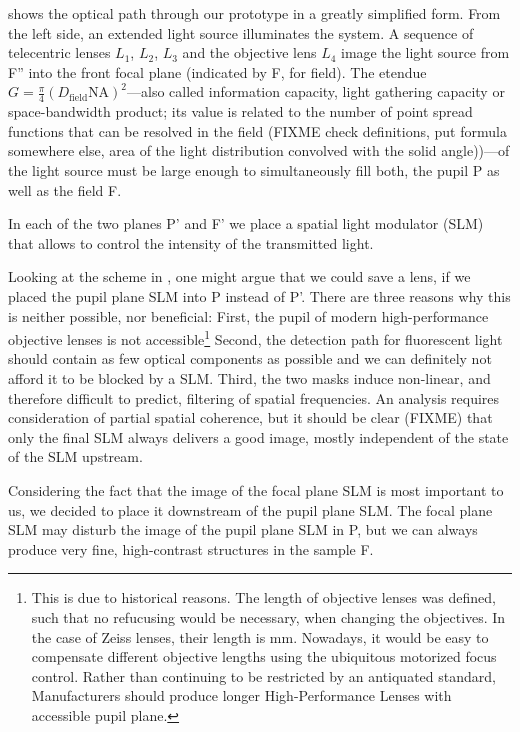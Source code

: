  shows the optical path through our prototype
in a greatly simplified form.  From the left side, an extended light
source illuminates the system. A sequence of telecentric lenses $L_1$,
$L_2$, $L_3$ and the objective lens $L_4$ image the light source from
F'' into the front focal plane (indicated by F, for field). The
etendue $G=\frac{\pi}{4}(D_\textrm{field}\textrm{NA})^2$---also called
information capacity, light gathering capacity or space-bandwidth
product; its value is related to the number of point spread functions
that can be resolved in the field (FIXME check definitions, put
formula somewhere else, area of the light distribution convolved with
the solid angle))---of the light source must be large enough to
simultaneously fill both, the pupil P as well as the field F.

In each of the two planes P' and F' we place a spatial light modulator (SLM)
that allows to control the intensity of the transmitted light.

Looking at the scheme in , one might argue
that we could save a lens, if we placed the pupil plane SLM into P
instead of P'. There are three reasons why this is neither possible,
nor beneficial: First, the pupil of modern high-performance objective
lenses is not accessible\footnote{This is due to historical reasons.
  The length of objective lenses was defined, such that no refucusing
  would be necessary, when changing the objectives. In the case of
  Zeiss lenses, their length is \unit[45]{mm}. Nowadays, it would be
  easy to compensate different objective lengths using the ubiquitous
  motorized focus control.  Rather than continuing to be restricted by
  an antiquated standard, Manufacturers should produce longer
  High-Performance Lenses with accessible pupil plane.}  Second, the
detection path for fluorescent light should contain as few optical
components as possible and we can definitely not afford it to be
blocked by a SLM.  Third, the two masks induce non-linear, and
therefore difficult to predict, filtering of spatial frequencies. An
analysis requires consideration of partial spatial coherence, but it
should be clear (FIXME) that only the final SLM always delivers a good
image, mostly independent of the state of the SLM upstream.

Considering the fact that the image of the focal plane SLM is most
important to us, we decided to place it downstream of the pupil plane
SLM. The focal plane SLM may disturb the image of the pupil plane SLM
in P, but we can always produce very
fine, high-contrast structures in the sample F.


